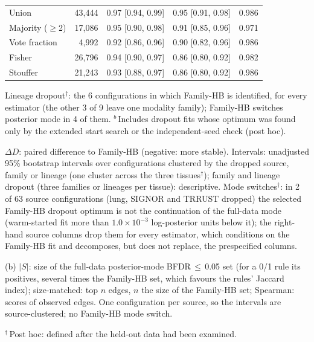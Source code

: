 \begin{table}[tbp]
{\begin{tabular}{@{}lrccc@{}}
Union & 43{,}444 & 0.97 [0.94, 0.99] & 0.95 [0.91, 0.98] & 0.986 \\
Majority ($\geq$2) & 17{,}086 & 0.95 [0.90, 0.98] & 0.91 [0.85, 0.96] & 0.971 \\
Vote fraction & 4{,}992 & 0.92 [0.86, 0.96] & 0.90 [0.82, 0.96] & 0.986 \\
Fisher & 26{,}796 & 0.94 [0.90, 0.97] & 0.86 [0.80, 0.92] & 0.982 \\
Stouffer & 21{,}243 & 0.93 [0.88, 0.97] & 0.86 [0.80, 0.92] & 0.986 \\
\bottomrule
\end{tabular}
}
\par\smallskip
\begin{minipage}{\linewidth}\footnotesize
Lineage dropout$^{\dagger}$: the 6 configurations in which Family-HB is identified, for every estimator (the other 3 of 9 leave one modality family); Family-HB switches posterior mode in 4 of them. $^{b}$\,Includes dropout fits whose optimum was found only by the extended start search or the independent-seed check (post hoc).

$\Delta D$: paired difference to Family-HB (negative: more stable). Intervals: unadjusted 95\% bootstrap intervals over configurations clustered by the dropped source, family or lineage (one cluster across the three tissues$^{\dagger}$); family and lineage dropout (three families or lineages per tissue): descriptive. Mode switches$^{\dagger}$: in 2 of 63 source configurations (lung, SIGNOR and TRRUST dropped) the selected Family-HB dropout optimum is not the continuation of the full-data mode (warm-started fit more than $1.0\times 10^{-3}$ log-posterior units below it); the right-hand source columns drop them for every estimator, which conditions on the Family-HB fit and decomposes, but does not replace, the prespecified columns.

(b) $|S|$: size of the full-data posterior-mode BFDR\,$\le$\,0.05 set (for a 0/1 rule its positives, several times the Family-HB set, which favours the rules' Jaccard index); size-matched: top $n$ edges, $n$ the size of the Family-HB set; Spearman: scores of observed edges. One configuration per source, so the intervals are source-clustered; no Family-HB mode switch.

$^{\dagger}$\,Post hoc: defined after the held-out data had been examined.
\end{minipage}
\end{table}
